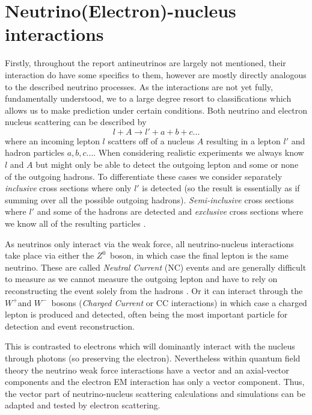 \documentclass[a4paper,12pt]{article}
\newcommand{\Zz}{$Z^0$}
\newcommand{\Wp}{$W^+$}
\newcommand{\Wm}{$W^-$}
\begin{document}
\section{Neutrino(Electron)-nucleus interactions}
Firstly, throughout the report antineutrinos are largely not mentioned, their interaction do have some specifics to them, however are mostly directly analogous to the described neutrino processes.
As the interactions are not yet fully, fundamentally understood, we to a large degree resort to classifications which allows us to make prediction under certain conditions.
Both neutrino and electron nucleus scattering can be described by
\begin{equation}\label{eq:genint}
    l + A \rightarrow l' + a + b + c ...
\end{equation}
where an incoming lepton $l$ scatters off of a nucleus $A$ resulting in a lepton $l'$ and hadron particles $a, b, c ...$.
When considering realistic experiments we always know $l$ and $A$ but might only be able to detect the outgoing lepton and some or none of the outgoing hadrons. 
To differentiate these cases we consider separately \emph{inclusive} cross sections where only $l'$ is detected (so the result is essentially as if summing over all the possible outgoing hadrons).
\emph{Semi-inclusive} cross sections where $l'$ and some of the hadrons are detected and \emph{exclusive} cross sections where we know all of the resulting particles \cite{amaroElectronNeutrinonucleusScattering2020}.

As neutrinos only interact via the weak force, all neutrino-nucleus interactions take place via either the \Zz\ boson, in which case the final lepton is the same neutrino.
These are called \emph{Neutral Current} (NC) events and are generally difficult to measure as we cannot measure the outgoing lepton and have to rely on reconstructing the event solely from the hadrons \cite{giustiNeutralCurrentNeutrinonucleus2020}.
Or it can interact through the \Wp and \Wm\ bosons (\emph{Charged Current} or CC interactions) in which case a charged lepton is produced and detected, often being the most important particle for detection and event reconstruction.

This is contrasted to electrons which will dominantly interact with the nucleus through photons (so preserving the electron).
Nevertheless within quantum field theory the neutrino weak force interactions have a vector and an axial-vector components and the electron EM interaction has only a vector component\cite{alvarez-rusoNuSTEC11NeutrinoScattering2018}.
Thus, the vector part of neutrino-nucleus scattering calculations and simulations can be adapted and tested by electron scattering.
\end{document}

